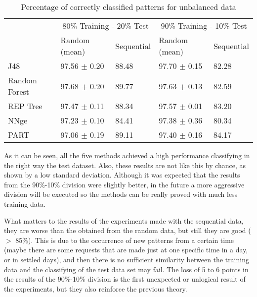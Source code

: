 \documentclass{llncs}
\begin{document}
\begin{table*}[htpb]
\centering
 \caption{\label{tabresults_nobalan} Percentage of correctly classified patterns for unbalanced data}
{\small
\begin{tabular}{|l|l|l|l|l|}
\cline{2-5}
\multicolumn{1}{l|}{} & \multicolumn{2}{c|}{80\% Training - 20\% Test} & \multicolumn{2}{c|}{90\% Training - 10\% Test} \\ 
\cline{2-5}
\multicolumn{1}{l|}{} & Random (mean) & Sequential & Random (mean) & Sequential \\ 
\hline
J48 & 97.56 $\pm$ 0.20 & 88.48 & 97.70 $\pm$ 0.15 & 82.28 \\ 
\cline{1-1}
Random Forest & 97.68 $\pm$ 0.20 & 89.77 & 97.63 $\pm$ 0.13 & 82.59 \\ 
\cline{1-1}
REP Tree & 97.47 $\pm$ 0.11 & 88.34 & 97.57 $\pm$ 0.01 & 83.20 \\ 
\cline{1-1}
NNge & 97.23 $\pm$ 0.10 & 84.41 & 97.38 $\pm$ 0.36 & 80.34 \\ 
\cline{1-1}
PART & 97.06 $\pm$ 0.19 & 89.11 & 97.40 $\pm$ 0.16 & 84.17 \\ 
\hline
\end{tabular}
}
\end{table*}
 
As it can be seen, all the five methods achieved a high performance classifying in the right way the test dataset. Also, these results are not like this by chance, as shown by a low standard deviation. Although it was expected that the results from the 90\%-10\% division were slightly better, in the future a more aggressive division will be executed so the methods can be really proved with much less training data.

What matters to the results of the experiments made with the sequential data, they are worse than the obtained from the random data, but still they are good ($>$ 85\%). This is due to the occurrence of new patterns from a certain time (maybe there are some requests that are made just at one specific time in a day, or in settled days), and then there is no sufficient similarity between the training data and the classifying of the test data set may fail. The loss of 5 to 6 points in the results of the 90\%-10\% division is the first unexpected or unlogical result of the experiments, but they also reinforce the previous theory.
\end{document}
